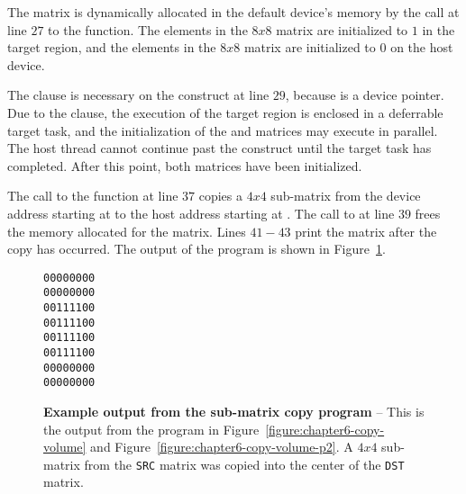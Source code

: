 The  matrix is dynamically allocated in the default device's memory
by the call at line $27$ to the  function.  
The elements in the $8x8$  matrix are initialized to $1$ in the target region,
and the elements in the $8x8$  matrix are initialized to $0$ on the host device.

The  clause is necessary on the  construct 
at line $29$, because  is a device pointer.
Due to the  clause, the execution of the target region is enclosed
in a deferrable target task, and
the initialization of the  and  matrices may execute in parallel.
The host thread cannot continue past the  construct until the target task
has completed.  After this point, both matrices have been initialized.

The call to the function  at line $37$ copies a $4x4$ sub-matrix
from the device address starting at  to the host address starting at .  The call to
 at line $39$ frees the memory allocated for the 
matrix.  Lines $41-43$ print the  matrix after the copy has occurred.  The output of the program is
shown in Figure~\ref{figure:chapter6-copy-volume-output}.

\begin{figure*}[!tb]
\begin{verbatim}
00000000
00000000
00111100
00111100
00111100
00111100
00000000
00000000
\end{verbatim}
\caption{ \textbf {Example output from the sub-matrix copy program } -- \small
          This is the output from the program in Figure~\ref{figure:chapter6-copy-volume}
          and Figure~\ref{figure:chapter6-copy-volume-p2}.
          A $4x4$ sub-matrix from the \texttt{SRC} matrix was copied into the center of the \texttt{DST} matrix.
         }
\label{figure:chapter6-copy-volume-output}
\end{figure*}
